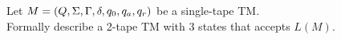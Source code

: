 Let $M = (Q, \Sigma, \Gamma, \delta, q_0, q_a, q_r)$ be a single-tape TM. \\
Formally describe a 2-tape TM with 3 states that accepts $L(M)$.